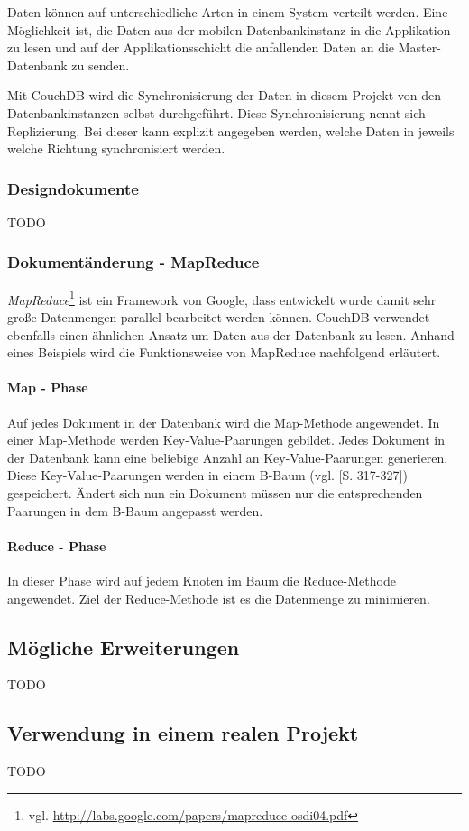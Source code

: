 Daten können auf unterschiedliche Arten in einem System verteilt werden. Eine
	Möglichkeit ist, die Daten aus der mobilen Datenbankinstanz in die Applikation
	zu lesen und auf der Applikationsschicht die anfallenden Daten an die
	Master-Datenbank zu senden.

Mit CouchDB wird die Synchronisierung der Daten in diesem Projekt von den
	Datenbankinstanzen selbst durchgeführt. Diese Synchronisierung nennt sich 
	Replizierung. Bei dieser kann explizit angegeben werden, welche Daten
	in jeweils welche Richtung synchronisiert werden.

\subsubsection{Designdokumente}

TODO

\subsubsection{Dokumentänderung - MapReduce}

\emph{MapReduce}\footnote{vgl. \url{http://labs.google.com/papers/mapreduce-osdi04.pdf}}
	ist ein Framework von Google, dass entwickelt wurde damit sehr große
	Datenmengen parallel bearbeitet werden können. CouchDB verwendet ebenfalls
	einen ähnlichen Ansatz um Daten aus der Datenbank zu lesen. Anhand eines
	Beispiels wird die Funktionsweise von MapReduce nachfolgend erläutert.

\paragraph{Map - Phase} Auf jedes Dokument in der Datenbank wird die Map-Methode
	angewendet. In einer Map-Methode werden Key-Value-Paarungen gebildet. Jedes
	Dokument in der Datenbank kann eine beliebige Anzahl an Key-Value-Paarungen
	generieren. Diese Key-Value-Paarungen werden in einem B-Baum (vgl.
	\cite{Ottmann96}[S. 317-327]) gespeichert. Ändert sich nun ein Dokument müssen
	nur die entsprechenden Paarungen in	dem B-Baum angepasst werden. 

\paragraph{Reduce - Phase} In dieser Phase wird auf jedem Knoten im Baum die
	Reduce-Methode angewendet. Ziel der Reduce-Methode ist es die Datenmenge zu
	minimieren.

\subsection{Mögliche Erweiterungen}

TODO

\subsection{Verwendung in einem realen Projekt}

TODO